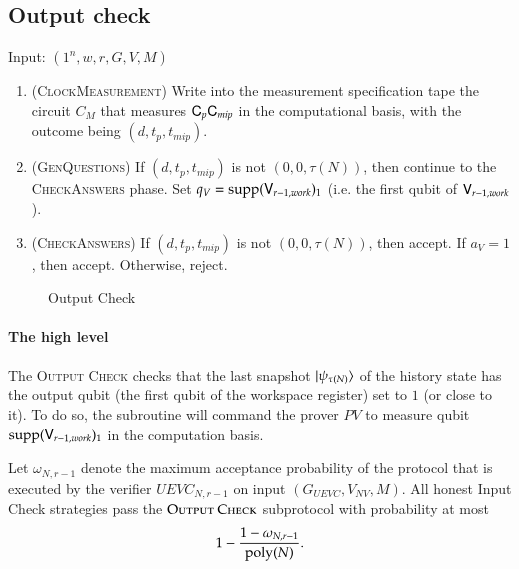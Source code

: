 \subsection{Output check}
\label{sec:output_check}


\vspace{10pt}
\begin{center}
\begin{mdframed}
    Input: $(1^n,w,r,G,V,M)$
	\begin{enumerate}
		\item (\textsc{ClockMeasurement}) Write into the measurement specification tape the circuit $C_M$ that measures ${\mathsf{C}}_p {\mathsf{C}}_{mip}$ in the computational basis, with the outcome being $(d,t_p,t_{mip})$.
		
		\item (\textsc{GenQuestions}) If $(d,t_p,t_{mip})$ is not $(0,0,\tau(N))$, then continue to the \textsc{CheckAnswers} phase. Set $q_V = \operatorname{supp}({\mathsf{V}}_{r-1,work})_1$ (i.e. the first qubit of ${\mathsf{V}}_{r-1,work}$).
		\item (\textsc{CheckAnswers}) If $(d,t_p,t_{mip})$ is not $(0,0,\tau(N))$, then accept. If $a_V = 1$, then accept. Otherwise, reject.
	\end{enumerate}    
\end{mdframed}
\end{center}
\begin{figure}[H]
\caption{Output Check}
\label{fig:output_check}
\end{figure}


\paragraph{The high level} The \textsc{Output Check} checks that the last snapshot $|\psi_{\tau(N)}\rangle$ of the history state has the output qubit (the first qubit of the workspace register) set to $1$ (or close to it). To do so, the subroutine will command the prover $PV$ to measure  qubit $\operatorname{supp}({\mathsf{V}}_{r-1,work})_1$ in the computation basis. 



\begin{theorem}	
\label{thm:output_check}
Let $\omega_{N,r-1}$ denote the maximum acceptance probability of the protocol that is executed by the verifier $UEVC_{N,r-1}$ on input $(G_{UEVC},V_{NV},M)$. All honest Input Check strategies pass the $\textsc{Output Check}$ subprotocol with probability at most 
\[
	1 - \frac{1 - \omega_{N,r-1}}{\operatorname{poly}(N)}.
\] %
\end{theorem}


